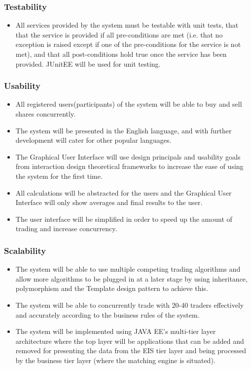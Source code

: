 \documentclass[12pt]{article}
\begin{document}
			    	\subsubsection{Testability}
			    	\begin{itemize}
			    		\item All services provided by the system must be testable with unit tests, that that the service is provided if all pre-conditions are met (i.e. that no exception is raised except if one of the pre-conditions for the service is not met), and that all post-conditions hold true once the service has been provided. JUnitEE will be used for unit testing.
			    	\end{itemize}
			    
			    	\subsubsection{Usability}
			    	\begin{itemize}
			    		\item All registered users(participants) of the system will be able to buy and sell shares concurrently.
			    		\item The system will be presented in the English language, and with further development will cater for other popular languages.
			        	\item The Graphical User Interface will use design principals and usability goals from interaction design theoretical frameworks to increase the ease of using the system for the first time.
			    	 	\item All calculations will be abstracted for the users and the Graphical User Interface will only show averages and final results to the user.
			    	   	\item The user interface will be simplified in order to speed up the amount of trading and increase concurrency.
			    	\end{itemize}
			    
			    	\subsubsection{Scalability}
			    	\begin{itemize}
			    		\item The system will be able to use multiple competing trading algorithms and allow more algorithms to be plugged in at a later stage by using inheritance, polymorphism and the Template design pattern to achieve this.
			    		\item The system will be able to concurrently trade with 20-40 traders effectively and accurately according to the business rules of the system.
			  	    	\item The system will be implemented using JAVA EE’s multi-tier layer architecture where the top layer will be applications that can be added and removed for presenting the data from the EIS tier layer and being processed by the business tier layer (where the matching engine is situated). 
			    	\end{itemize}
			    	
\end{document}
